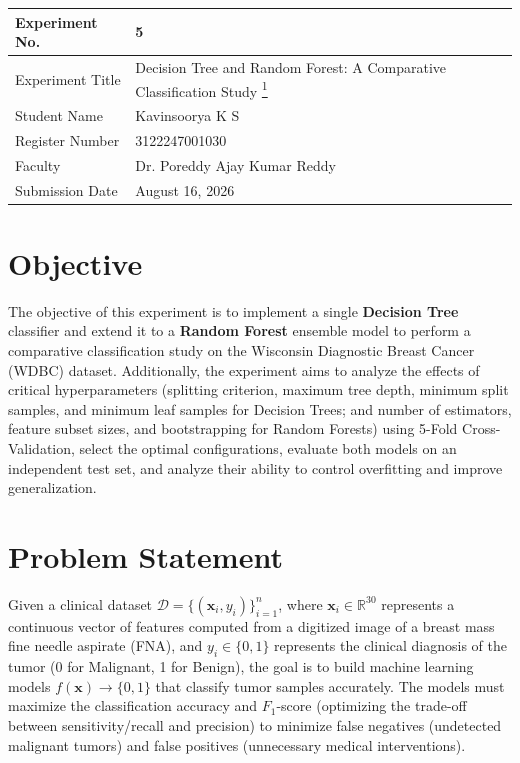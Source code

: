 \documentclass[12pt,a4paper]{article}
\begin{document}
\begin{tabular}{|p{4cm}|p{11cm}|}
\hline
Experiment No. & 5 \\ \hline
Experiment Title & Decision Tree and Random Forest: A Comparative Classification Study \href{https://github.com/Kavin-ks/Machine-Learning-Projects}{\textsuperscript{1}}\\ \hline
Student Name & Kavinsoorya K S \\ \hline
Register Number & 3122247001030 \\ \hline
Faculty & Dr. Poreddy Ajay Kumar Reddy \\ \hline
Submission Date & August 16, 2026 \\ \hline
\end{tabular}

\vspace{0.5cm}

\section{Objective}
The objective of this experiment is to implement a single \textbf{Decision Tree} classifier and extend it to a \textbf{Random Forest} ensemble model to perform a comparative classification study on the Wisconsin Diagnostic Breast Cancer (WDBC) dataset. Additionally, the experiment aims to analyze the effects of critical hyperparameters (splitting criterion, maximum tree depth, minimum split samples, and minimum leaf samples for Decision Trees; and number of estimators, feature subset sizes, and bootstrapping for Random Forests) using 5-Fold Cross-Validation, select the optimal configurations, evaluate both models on an independent test set, and analyze their ability to control overfitting and improve generalization.

\section{Problem Statement}
Given a clinical dataset $\mathcal{D} = \{(\mathbf{x}_i, y_i)\}_{i=1}^n$, where $\mathbf{x}_i \in \mathbb{R}^{30}$ represents a continuous vector of features computed from a digitized image of a breast mass fine needle aspirate (FNA), and $y_i \in \{0, 1\}$ represents the clinical diagnosis of the tumor (0 for Malignant, 1 for Benign), the goal is to build machine learning models $f(\mathbf{x}) \to \{0, 1\}$ that classify tumor samples accurately. The models must maximize the classification accuracy and $F_1$-score (optimizing the trade-off between sensitivity/recall and precision) to minimize false negatives (undetected malignant tumors) and false positives (unnecessary medical interventions).
\end{document}
